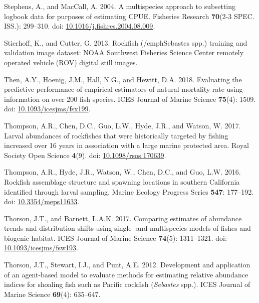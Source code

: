 \documentclass[11pt,
  english,
]{article}
\newlength{\cslhangindent}
\newenvironment{CSLReferences}[2] %
 {%
  \setlength{\parindent}{0pt}
  \ifodd #1 \everypar{\setlength{\hangindent}{\cslhangindent}}\ignorespaces\fi
  \ifnum #2 > 0
  \setlength{\parskip}{#2\baselineskip}
  \fi
 }%
 {}
\begin{document}
\begin{CSLReferences}{1}{0}
\leavevmode{}%
Stephens, A., and MacCall, A. 2004. {A multispecies approach to subsetting logbook data for purposes of estimating CPUE}. Fisheries Research \textbf{70}(2-3 SPEC. ISS.): 299--310. doi: \href{https://doi.org/10.1016/j.fishres.2004.08.009}{10.1016/j.fishres.2004.08.009}.

\leavevmode{}%
Stierhoff, K., and Cutter, G. 2013. {Rockfish (/emph{Sebastes spp.}) training and validation image dataset: NOAA Southwest Fisheries Science Center remotely operated vehicle (ROV) digital still images.}

\leavevmode{}%
Then, A.Y., Hoenig, J.M., Hall, N.G., and Hewitt, D.A. 2018. {Evaluating the predictive performance of empirical estimators of natural mortality rate using information on over 200 fish species}. ICES Journal of Marine Science \textbf{75}(4): 1509. doi: \href{https://doi.org/10.1093/icesjms/fsx199}{10.1093/icesjms/fsx199}.

\leavevmode{}%
Thompson, A.R., Chen, D.C., Guo, L.W., Hyde, J.R., and Watson, W. 2017. {Larval abundances of rockfishes that were historically targeted by fishing increased over 16 years in association with a large marine protected area}. Royal Society Open Science \textbf{4}(9). doi: \href{https://doi.org/10.1098/rsos.170639}{10.1098/rsos.170639}.

\leavevmode{}%
Thompson, A.R., Hyde, J.R., Watson, W., Chen, D.C., and Guo, L.W. 2016. {Rockfish assemblage structure and spawning locations in southern California identified through larval sampling}. Marine Ecology Progress Series \textbf{547}: 177--192. doi: \href{https://doi.org/10.3354/meps11633}{10.3354/meps11633}.

\leavevmode{}%
Thorson, J.T., and Barnett, L.A.K. 2017. {Comparing estimates of abundance trends and distribution shifts using single- and multispecies models of fishes and biogenic habitat}. ICES Journal of Marine Science \textbf{74}(5): 1311--1321. doi: \href{https://doi.org/10.1093/icesjms/fsw193}{10.1093/icesjms/fsw193}.

\leavevmode{}%
Thorson, J.T., Stewart, I.J., and Punt, A.E. 2012. {Development and application of an agent-based model to evaluate methods for estimating relative abundance indices for shoaling fish such as Pacific rockfish (\emph{Sebastes} spp.)}. ICES Journal of Marine Science \textbf{69}(4): 635--647.


\end{CSLReferences}
\end{document}
